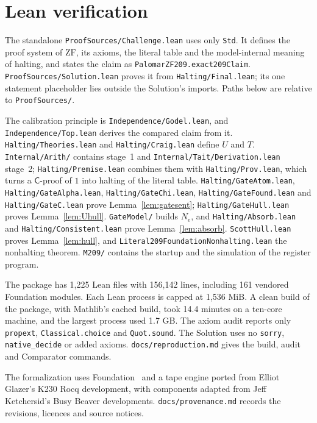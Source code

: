 \documentclass[11pt,letterpaper]{article}
\newcommand{\ZF}{\mathrm{ZF}}
\newcommand{\Cc}{\mathsf{C}}
\newcommand{\file}[1]{\texttt{\nolinkurl{#1}}}
\begin{document}
\section{Lean verification}\label{sec:status}

The standalone \file{ProofSources/Challenge.lean} uses only \file{Std}.
It defines the proof system of $\ZF$, its axioms, the literal table and the
model-internal meaning of halting, and states the claim as
\file{PalomarZF209.exact209Claim}. \file{ProofSources/Solution.lean} proves
it from \file{Halting/Final.lean}; its one statement placeholder lies
outside the Solution's imports. Paths below are relative to
\file{ProofSources/}.

The calibration principle is \file{Independence/Godel.lean}, and
\file{Independence/Top.lean} derives the compared claim from it.
\file{Halting/Theories.lean} and \file{Halting/Craig.lean} define $U$ and
$T$. \file{Internal/Arith/} contains stage~1 and
\file{Internal/Tait/Derivation.lean} stage~2; \file{Halting/Premise.lean}
combines them with \file{Halting/Prov.lean}, which turns a $\Cc$-proof of
$1$ into halting of the literal table. \file{Halting/GateAtom.lean},
\file{Halting/GateAlpha.lean}, \file{Halting/GateChi.lean},
\file{Halting/GateFound.lean} and \file{Halting/GateC.lean} prove
Lemma~\ref{lem:gatesent}; \file{Halting/GateHull.lean} proves
Lemma~\ref{lem:Uhull}. \file{GateModel/} builds $N_e$, and
\file{Halting/Absorb.lean} and \file{Halting/Consistent.lean} prove
Lemma~\ref{lem:absorb}. \file{ScottHull.lean} proves
Lemma~\ref{lem:hull}, and \file{Literal209FoundationNonhalting.lean} the
nonhalting theorem. \file{M209/} contains the startup and the simulation
of the register program.

The package has 1,225 Lean files with 156,142 lines, including 161
vendored Foundation modules. Each Lean process is capped at 1,536 MiB.
A clean build of the package, with Mathlib's cached build, took
14.4 minutes on a ten-core machine, and the largest process used 1.7 GB.
The axiom audit reports only \file{propext}, \file{Classical.choice} and
\file{Quot.sound}. The Solution uses no \file{sorry},
\file{native_decide} or added axioms. \file{docs/reproduction.md} gives the
build, audit and Comparator commands.

The formalization uses Foundation~\cite{foundation} and a tape engine
ported from Elliot Glazer's K230 Rocq development, with components adapted
from Jeff Ketchersid's Busy Beaver developments. \file{docs/provenance.md}
records the revisions, licences and source notices.
\end{document}
